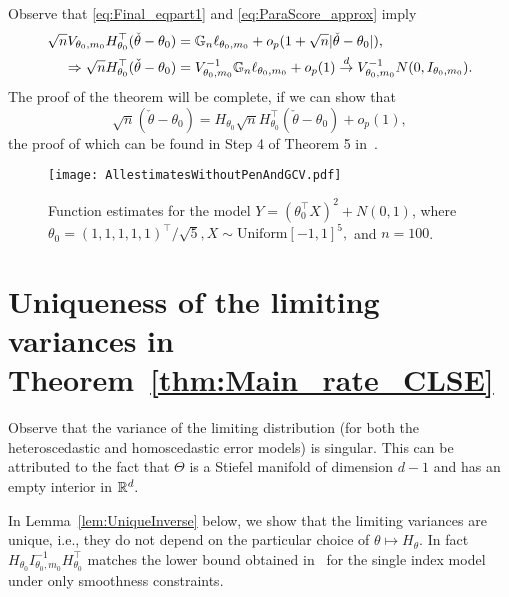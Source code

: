    \noindent  Observe that  \eqref{eq:Final_eqpart1} and \eqref{eq:ParaScore_approx} imply
   \begin{align} \label{eq:final_thm}
    \begin{split}
  \sqrt{n}V_{\theta_0,m_0}  H_{\theta_0}^\top(\check{\theta}- \theta_0)  ={}&\mathbb{G}_n \ell_{\theta_0,m_0} + o_p(1+\sqrt{n} |\check{\theta}-\theta_0|),\\
   \Rightarrow  \sqrt{n} H_{\theta_0}^\top (\check{\theta}- \theta_0) ={}& V_{\theta_0,m_0}^{-1}\mathbb{G}_n \ell_{\theta_0,m_0} + o_p(1) \stackrel{d}{\rightarrow} V_{\theta_0,m_0}^{-1} N(0, {I}_{\theta_0,m_0}).
   \end{split}
   \end{align}
  The proof of the theorem will be complete, if we can show that  $$\sqrt{n}(\check{\theta}- \theta_0)=H_{\theta_0} \sqrt{n} H_{\theta_0}^\top(\check{\theta}- \theta_0) +o_p(1),$$ the proof of which can be found in Step 4 of Theorem 5 in~\cite{Patra16}. 
\begin{figure}[!ht]
\centering
\texttt{[image: AllestimatesWithoutPenAndGCV.pdf]}\\ %
\caption[An illustrative example]{Function estimates for  the model $Y=(\theta_0^\top X)^2+ N(0,1)$, where $\theta_0=(1,1,1,1,1)^\top/\sqrt{5}, X\sim\text{Uniform}[-1,1]^5,$ and $n=100$.}
\label{fig:SimplModel}
\end{figure}


\section{Uniqueness of the limiting variances in Theorem~\ref{thm:Main_rate_CLSE}}\label{sec:Degenracy}

Observe that the variance of the limiting distribution (for both the heteroscedastic and homoscedastic error models) is singular. This can be attributed to the fact that $\Theta$ is a Stiefel manifold of dimension ${d-1}$ and has an empty interior in $\mathbb{R}^d.$

In Lemma~\ref{lem:UniqueInverse} below, we show that the limiting variances are unique, i.e., they do not depend on the particular choice of $\theta\mapsto H_\theta$.  In fact $H_{\theta_0}{I}^{-1}_{\theta_0,m_0} H_{\theta_0}^\top$ matches the lower bound obtained in~\cite{NeweyStroker93} for the single index model under only smoothness constraints. 

